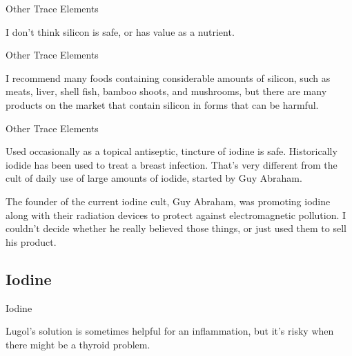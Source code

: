 \documentclass[11pt,oneside,openany,extrafontsizes]{memoir}
\begin{document}
\begin{standalonequote}{Other Trace Elements}

    \begin{answer}
      I don't think silicon is safe, or has value as a nutrient.
    \end{answer}
\end{standalonequote}

\begin{standalonequote}{Other Trace Elements}

    \begin{answer}
      I recommend many foods containing considerable amounts of silicon, such as meats, liver, shell fish, bamboo shoots, and mushrooms, but there are many products on the market that contain silicon in forms that can be harmful.
    \end{answer}
\end{standalonequote}

\begin{standalonequote}{Other Trace Elements}

    \begin{answer}
      Used occasionally as a topical antiseptic, tincture of iodine is safe. Historically iodide has been used to treat a breast infection. That's very different from the cult of daily use of large amounts of iodide, started by Guy Abraham.

      The founder of the current iodine cult, Guy Abraham, was promoting iodine along with their radiation devices to protect against electromagnetic pollution. I couldn't decide whether he really believed those things, or just used them to sell his product.
    \end{answer}
\end{standalonequote}

\subsection{Iodine}

\begin{standalonequote}{Iodine}

    \begin{answer}
        Lugol's solution is sometimes helpful for an inflammation, but it's risky when there might be a thyroid problem.
    \end{answer}
\end{standalonequote}
\end{document}
